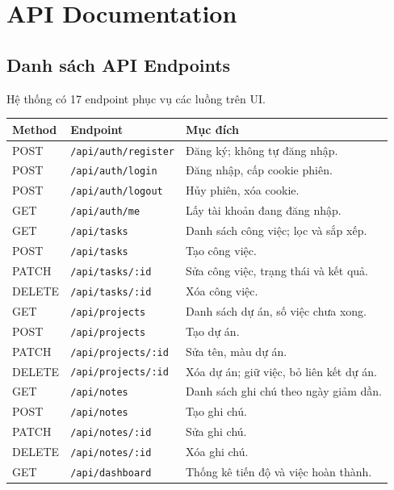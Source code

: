 \section{API Documentation}

\subsection{Danh sách API Endpoints}
Hệ thống có 17 endpoint phục vụ các luồng trên UI.

\begingroup
\small
\begin{longtable}{@{}P{.11\linewidth}P{.39\linewidth}P{.41\linewidth}@{}}
\toprule
\textbf{Method} & \textbf{Endpoint} & \textbf{Mục đích} \\
\midrule
\endhead
POST & \texttt{/api/auth/register} & Đăng ký; không tự đăng nhập. \\
POST & \texttt{/api/auth/login} & Đăng nhập, cấp cookie phiên. \\
POST & \texttt{/api/auth/logout} & Hủy phiên, xóa cookie. \\
GET & \texttt{/api/auth/me} & Lấy tài khoản đang đăng nhập. \\
\midrule
GET & \texttt{/api/tasks} & Danh sách công việc; lọc và sắp xếp. \\
POST & \texttt{/api/tasks} & Tạo công việc. \\
PATCH & \texttt{/api/tasks/:id} & Sửa công việc, trạng thái và kết quả. \\
DELETE & \texttt{/api/tasks/:id} & Xóa công việc. \\
\midrule
GET & \texttt{/api/projects} & Danh sách dự án, số việc chưa xong. \\
POST & \texttt{/api/projects} & Tạo dự án. \\
PATCH & \texttt{/api/projects/:id} & Sửa tên, màu dự án. \\
DELETE & \texttt{/api/projects/:id} & Xóa dự án; giữ việc, bỏ liên kết dự án. \\
\midrule
GET & \texttt{/api/notes} & Danh sách ghi chú theo ngày giảm dần. \\
POST & \texttt{/api/notes} & Tạo ghi chú. \\
PATCH & \texttt{/api/notes/:id} & Sửa ghi chú. \\
DELETE & \texttt{/api/notes/:id} & Xóa ghi chú. \\
\midrule
GET & \texttt{/api/dashboard} & Thống kê tiến độ và việc hoàn thành. \\
\bottomrule
\end{longtable}
\endgroup

